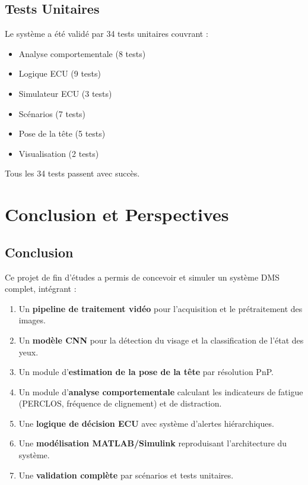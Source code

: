 \documentclass[12pt,a4paper]{report}
\begin{document}
\section{Tests Unitaires}

Le système a été validé par 34 tests unitaires couvrant :
\begin{itemize}
    \item Analyse comportementale (8 tests)
    \item Logique ECU (9 tests)
    \item Simulateur ECU (3 tests)
    \item Scénarios (7 tests)
    \item Pose de la tête (5 tests)
    \item Visualisation (2 tests)
\end{itemize}

Tous les 34 tests passent avec succès.

\chapter{Conclusion et Perspectives}

\section{Conclusion}

Ce projet de fin d'études a permis de concevoir et simuler un système DMS complet, intégrant :

\begin{enumerate}
    \item Un \textbf{pipeline de traitement vidéo} pour l'acquisition et le prétraitement des images.
    \item Un \textbf{modèle CNN} pour la détection du visage et la classification de l'état des yeux.
    \item Un module d'\textbf{estimation de la pose de la tête} par résolution PnP.
    \item Un module d'\textbf{analyse comportementale} calculant les indicateurs de fatigue (PERCLOS, fréquence de clignement) et de distraction.
    \item Une \textbf{logique de décision ECU} avec système d'alertes hiérarchiques.
    \item Une \textbf{modélisation MATLAB/Simulink} reproduisant l'architecture du système.
    \item Une \textbf{validation complète} par scénarios et tests unitaires.
\end{enumerate}
\end{document}
